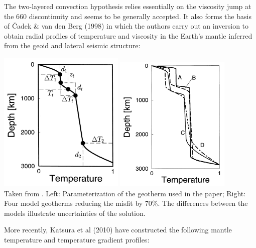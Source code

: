 The two-layered convection hypothesis relies essentially 
on the viscosity jump at the 660 discontinuity and seems 
to be generally accepted.
It also forms the basis of {\v{C}}adek \& van den Berg (1998) \cite{cava98}
in which the authors carry out an inversion to obtain 
radial profiles of temperature and viscosity in the Earth’s mantle
inferred from the geoid and lateral seismic structure:
\begin{center}
\includegraphics[width=6cm]{images/adiabatic/cava98a.png}
\includegraphics[width=5.5cm]{images/adiabatic/cava98b.png}\\
{\captionfont Taken from \cite{cava98}. 
Left: Parameterization of the geotherm used in the paper;
Right: Four model geotherms reducing the misfit by 70\%. The
differences between the models illustrate uncertainties of the
solution.}
\end{center}

More recently, Katsura et al (2010) \cite{kayy10} have constructed the following mantle temperature 
and temperature gradient profiles:

